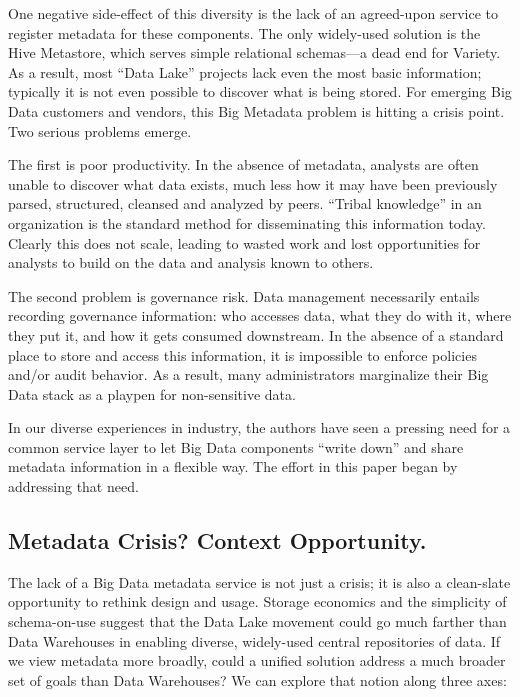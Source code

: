 \documentclass{sig-alternate}
\begin{document}
One negative side-effect of this diversity is the lack of an agreed-upon service to register metadata for these components. The only widely-used solution is the Hive Metastore, which serves simple relational schemas---a dead end for Variety. As a result, most ``Data Lake'' projects lack even the most basic information; typically it is not even possible to discover what is being stored. 
For emerging Big Data customers and vendors, this Big Metadata problem is hitting a crisis point.  Two serious problems emerge.

The first is poor productivity.
In the absence of metadata, analysts are often unable to discover what data exists, much less how it may have been previously parsed, structured, cleansed and analyzed by peers. ``Tribal knowledge'' in an organization is the standard method for disseminating this information today. Clearly this does not scale, leading to wasted work and lost opportunities for analysts to build on the data and analysis known to others.

The second problem is governance risk. Data management necessarily entails recording governance information: who accesses data, what they do with it, where they put it, and how it gets consumed downstream. 
In the absence of a standard place to store and access this information, it is impossible to enforce policies and/or audit behavior. As a result, many administrators marginalize their Big Data stack as a playpen for non-sensitive data.

In our diverse experiences in industry, the authors have seen a pressing need for a common service layer to let Big Data components ``write down'' and share metadata information in a flexible way. The effort in this paper began by addressing that need.

\subsection{Metadata Crisis? Context Opportunity.}
The lack of a Big Data metadata service is not just a crisis; it is also a clean-slate opportunity to rethink design and usage. Storage economics and the simplicity of schema-on-use suggest that the Data Lake movement could go much farther than Data Warehouses in enabling diverse, widely-used central repositories of data.  If we view metadata more broadly, could a unified solution address a much broader set of goals than Data Warehouses? We can explore that notion along three axes:
\end{document}
